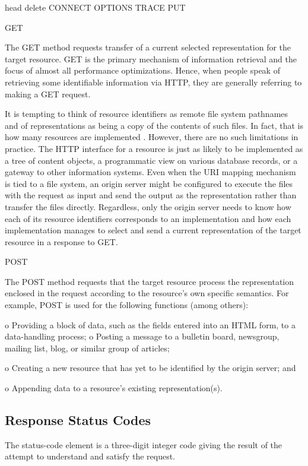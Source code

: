 head 
delete      
CONNECT
OPTIONS
TRACE
PUT

GET

   The GET method requests transfer of a current selected representation
   for the target resource.  GET is the primary mechanism of information
   retrieval and the focus of almost all performance optimizations.
   Hence, when people speak of retrieving some identifiable information
   via HTTP, they are generally referring to making a GET request.

   It is tempting to think of resource identifiers as remote file system
   pathnames and of representations as being a copy of the contents of
   such files.  In fact, that is how many resources are implemented 
   .  However, there are
   no such limitations in practice.  The HTTP interface for a resource
   is just as likely to be implemented as a tree of content objects, a
   programmatic view on various database records, or a gateway to other
   information systems.  Even when the URI mapping mechanism is tied to
   a file system, an origin server might be configured to execute the
   files with the request as input and send the output as the
   representation rather than transfer the files directly.  Regardless,
   only the origin server needs to know how each of its resource
   identifiers corresponds to an implementation and how each
   implementation manages to select and send a current representation of
   the target resource in a response to GET.


    POST

   The POST method requests that the target resource process the
   representation enclosed in the request according to the resource's
   own specific semantics.  For example, POST is used for the following
   functions (among others):

   o  Providing a block of data, such as the fields entered into an HTML
      form, to a data-handling process;
      o  Posting a message to a bulletin board, newsgroup, mailing list,
      blog, or similar group of articles;

   o  Creating a new resource that has yet to be identified by the
      origin server; and

   o  Appending data to a resource's existing representation(s).


\subsection{Response Status Codes} 
The status-code element is a three-digit integer code giving the
   result of the attempt to understand and satisfy the request.

